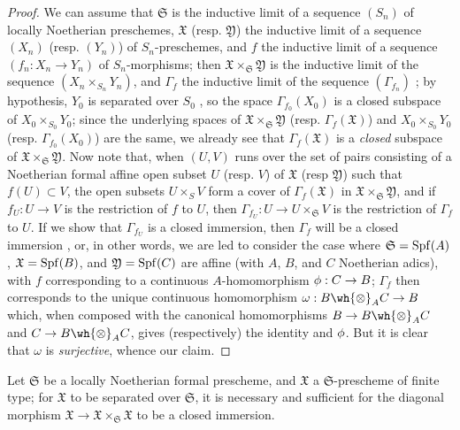 \begin{proof}
\label{proof-1.10.15.4}
We can assume that $\mathfrak{S}$ is the inductive limit of a sequence $(S_n)$ of locally Noetherian preschemes, $\mathfrak{X}$ (resp. $\mathfrak{Y}$) the inductive limit of a sequence $(X_n)$ (resp. $(Y_n)$) of $S_n$-preschemes, and $f$ the inductive limit of a sequence $(f_n:X_n\to Y_n)$ of $S_n$-morphisms;
then $\mathfrak{X}\times_\mathfrak{S}\mathfrak{Y}$ is the inductive limit of the sequence $(X_n\times_{S_n}Y_n)$, and $\Gamma_f$ the inductive limit of the sequence $(\Gamma_{f_n})$ ;
by hypothesis, $Y_0$ is separated over $S_0$ , so the space $\Gamma_{f_0}(X_0)$ is a closed subspace of $X_0\times_{S_0}Y_0$;
since the underlying spaces of $\mathfrak{X}\times_\mathfrak{S}\mathfrak{Y}$ (resp. $\Gamma_f(\mathfrak{X})$) and $X_0\times_{S_0}Y_0$ (resp. $\Gamma_{f_0}(X_0)$) are the same, we already see that $\Gamma_f(\mathfrak{X})$ is a \emph{closed} subspace of $\mathfrak{X}\times_\mathfrak{S}\mathfrak{Y}$.
Now note that, when $(U,V)$ runs over the set of pairs consisting of a Noetherian formal affine open subset $U$ (resp. $V$) of $\mathfrak{X}$ (resp $\mathfrak{Y}$) such that $f(U)\subset V$, the open subsets $U\times_S V$ form a cover of $\Gamma_f(\mathfrak{X})$ in $\mathfrak{X}\times_\mathfrak{S}\mathfrak{Y}$, and if $f_U:U\to V$ is the restriction of $f$ to $U$, then $\Gamma_{f_U}:U\to U\times_\mathfrak{S}V$ is the restriction of $\Gamma_f$ to $U$.
If we show that $\Gamma_{f_U}$ is a closed immersion, then $\Gamma_f$ will be a closed immersion , or, in other words, we are led to consider the case where $\mathfrak{S}=\operatorname{Spf}(A)$, $\mathfrak{X}=\operatorname{Spf}(B)$, and $\mathfrak{Y}=\operatorname{Spf}(C)$ are affine (with $A$, $B$, and $C$ Noetherian adics), with $f$ corresponding to a continuous $A$-homomorphism $\vphi:C\to B$;
$\Gamma_f$ then corresponds to the unique continuous homomorphism $\omega: B\wh{\otimes}_A C\to B$ which, when composed with the canonical homomorphisms $B\to B\wh{\otimes}_A C$ and $C\to B\wh{\otimes}_A C$, gives (respectively) the identity and $\phi$.
But it is clear that $\omega$ is \emph{surjective}, whence our claim.
\end{proof}

\begin{cor}[10.15.5]
\label{1.10.15.5}
Let $\mathfrak{S}$ be a locally Noetherian formal prescheme, and $\mathfrak{X}$ a $\mathfrak{S}$-prescheme of finite type;
for $\mathfrak{X}$ to be separated over $\mathfrak{S}$, it is necessary and sufficient for the diagonal morphism $\mathfrak{X}\to\mathfrak{X}\times_\mathfrak{S}\mathfrak{X}$ to be a closed immersion.
\end{cor}


